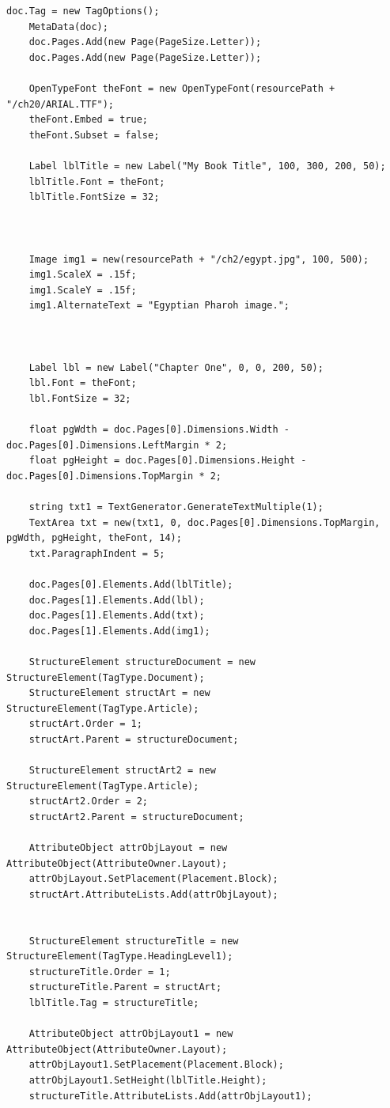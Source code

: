 \documentclass[american]{tufte-book}
\numberwithin{equation}{section}
\numberwithin{figure}{section}
\begin{document}
{{\begin{lstlisting}[caption={Adding attributes to a document's tags.},label={lis:Adding-attributes-to},basicstyle={\footnotesize\ttfamily},breaklines=true]
    doc.Tag = new TagOptions();
    MetaData(doc);
    doc.Pages.Add(new Page(PageSize.Letter));
    doc.Pages.Add(new Page(PageSize.Letter));

    OpenTypeFont theFont = new OpenTypeFont(resourcePath + "/ch20/ARIAL.TTF");
    theFont.Embed = true;
    theFont.Subset = false;

    Label lblTitle = new Label("My Book Title", 100, 300, 200, 50);
    lblTitle.Font = theFont;
    lblTitle.FontSize = 32;



    Image img1 = new(resourcePath + "/ch2/egypt.jpg", 100, 500);
    img1.ScaleX = .15f;
    img1.ScaleY = .15f;
    img1.AlternateText = "Egyptian Pharoh image.";

   

    Label lbl = new Label("Chapter One", 0, 0, 200, 50);
    lbl.Font = theFont;
    lbl.FontSize = 32;

    float pgWdth = doc.Pages[0].Dimensions.Width - doc.Pages[0].Dimensions.LeftMargin * 2;
    float pgHeight = doc.Pages[0].Dimensions.Height - doc.Pages[0].Dimensions.TopMargin * 2;

    string txt1 = TextGenerator.GenerateTextMultiple(1);
    TextArea txt = new(txt1, 0, doc.Pages[0].Dimensions.TopMargin, pgWdth, pgHeight, theFont, 14);
    txt.ParagraphIndent = 5;

    doc.Pages[0].Elements.Add(lblTitle);
    doc.Pages[1].Elements.Add(lbl);
    doc.Pages[1].Elements.Add(txt);
    doc.Pages[1].Elements.Add(img1);

    StructureElement structureDocument = new StructureElement(TagType.Document);
    StructureElement structArt = new StructureElement(TagType.Article);
    structArt.Order = 1;
    structArt.Parent = structureDocument;

    StructureElement structArt2 = new StructureElement(TagType.Article);
    structArt2.Order = 2;
    structArt2.Parent = structureDocument;
   
    AttributeObject attrObjLayout = new AttributeObject(AttributeOwner.Layout);
    attrObjLayout.SetPlacement(Placement.Block);
    structArt.AttributeLists.Add(attrObjLayout);


    StructureElement structureTitle = new StructureElement(TagType.HeadingLevel1);
    structureTitle.Order = 1;
    structureTitle.Parent = structArt;
    lblTitle.Tag = structureTitle;

    AttributeObject attrObjLayout1 = new AttributeObject(AttributeOwner.Layout);
    attrObjLayout1.SetPlacement(Placement.Block);
    attrObjLayout1.SetHeight(lblTitle.Height);
    structureTitle.AttributeLists.Add(attrObjLayout1);



\end{lstlisting}}}
\end{document}
